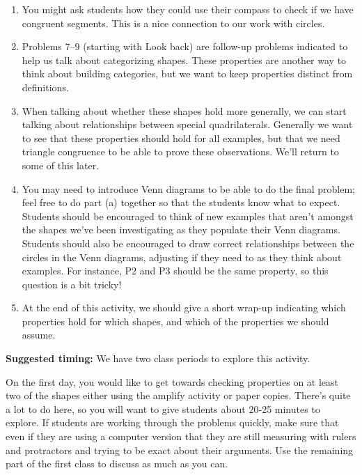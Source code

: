 \documentclass[noauthor, nooutcomes]{ximera}
\begin{document}
\begin{instructorNotes}
\begin{enumerate}
\item You might ask students how they could use their compass to check if we have congruent segments.  This is a nice connection to our work with circles.
\item Problems 7--9 (starting with Look back) are follow-up problems indicated to help us talk about categorizing shapes. These properties are another way to think about building categories, but we want to keep properties distinct from definitions. 
\item When talking about whether these shapes hold more generally, we can start talking about relationships between special quadrilaterals. Generally we want to see that these properties should hold for all examples, but that we need triangle congruence to be able to prove these observations. We'll return to some of this later.
\item You may need to introduce Venn diagrams to be able to do the final problem; feel free to do part (a) together so that the students know what to expect. Students should be encouraged to think of new examples that aren't amongst the shapes we've been investigating as they populate their Venn diagrams. Students should also be encouraged to draw correct relationships between the circles in the Venn diagrams, adjusting if they need to as they think about examples. For instance, P2 and P3 should be the same property, so this question is a bit tricky!
\item At the end of this activity, we should give a short wrap-up indicating which properties hold for which shapes, and which of the properties we should assume.
\end{enumerate}


{\bf Suggested timing:} We have two class periods to explore this activity. 

On the first day, you would like to get towards checking properties on at least two of the shapes either using the amplify activity or paper copies. There's quite a lot to do here, so you will want to give students about 20-25 minutes to explore. If students are working through the problems quickly, make sure that even if they are using a computer version that they are still measuring with rulers and protractors and trying to be exact about their arguments. Use the remaining part of the first class to discuss as much as you can.


\end{instructorNotes}
\end{document}
